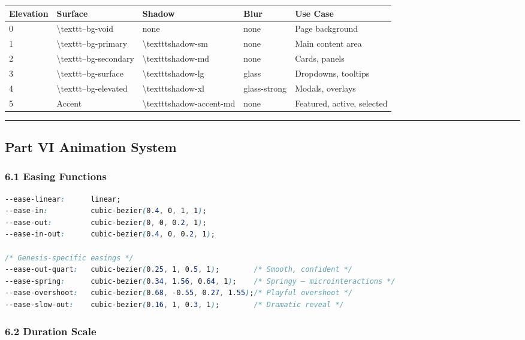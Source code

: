 \documentclass[11pt,a4paper]{article}
\begin{document}
\begin{longtable}{lllll}
\toprule
Elevation & Surface & Shadow & Blur & Use Case \\
\midrule
\endhead
0 & \textbackslash{}texttt{--bg-void} & none & none & Page background \\
1 & \textbackslash{}texttt{--bg-primary} & \textbackslash{}texttt{shadow-sm} & none & Main content area \\
2 & \textbackslash{}texttt{--bg-secondary} & \textbackslash{}texttt{shadow-md} & none & Cards, panels \\
3 & \textbackslash{}texttt{--bg-surface} & \textbackslash{}texttt{shadow-lg} & glass & Dropdowns, tooltips \\
4 & \textbackslash{}texttt{--bg-elevated} & \textbackslash{}texttt{shadow-xl} & glass-strong & Modals, overlays \\
5 & Accent & \textbackslash{}texttt{shadow-accent-md} & none & Featured, active, selected \\
\bottomrule
\end{longtable}

\noindent\rule{\textwidth}{0.4pt}

\subsection*{Part VI  Animation System}

\subsubsection*{6.1 Easing Functions}

\begin{lstlisting}[language=css]
--ease-linear:      linear;
--ease-in:          cubic-bezier(0.4, 0, 1, 1);
--ease-out:         cubic-bezier(0, 0, 0.2, 1);
--ease-in-out:      cubic-bezier(0.4, 0, 0.2, 1);

/* Genesis-specific easings */
--ease-out-quart:   cubic-bezier(0.25, 1, 0.5, 1);        /* Smooth, confident */
--ease-spring:      cubic-bezier(0.34, 1.56, 0.64, 1);    /* Springy — microinteractions */
--ease-overshoot:   cubic-bezier(0.68, -0.55, 0.27, 1.55);/* Playful overshoot */
--ease-slow-out:    cubic-bezier(0.16, 1, 0.3, 1);        /* Dramatic reveal */
\end{lstlisting}

\subsubsection*{6.2 Duration Scale}
\end{document}
